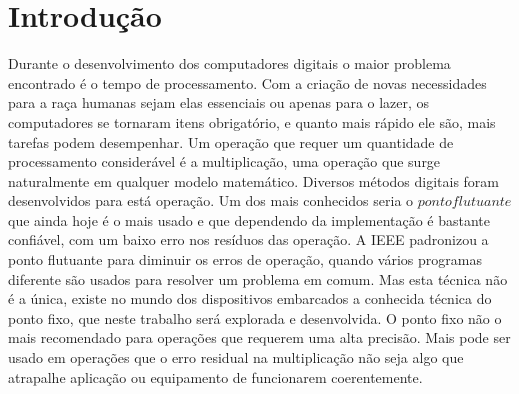 \section{Introdução}

Durante o desenvolvimento dos computadores digitais o maior problema encontrado
é o tempo de processamento. Com a criação de novas necessidades para a raça humanas
sejam elas essenciais ou apenas para o lazer, os computadores se tornaram 
itens obrigatório, e quanto mais rápido ele são, mais tarefas podem desempenhar.
Um operação que requer um quantidade de processamento considerável é a multiplicação,
uma operação que surge naturalmente em qualquer modelo matemático. Diversos
métodos digitais foram desenvolvidos para está operação. Um dos mais conhecidos 
seria o $ponto flutuante$ que ainda hoje é o mais usado e que dependendo da implementação
é bastante confiável, com um baixo erro nos resíduos das operação. A IEEE padronizou
a ponto flutuante para diminuir os erros de operação, quando vários programas 
diferente são usados para resolver um problema em comum. Mas esta técnica não
é a única, existe no mundo dos dispositivos embarcados a conhecida técnica do 
ponto fixo, que neste trabalho será explorada e desenvolvida. O ponto fixo 
não o mais recomendado para operações que requerem uma alta precisão. Mais 
pode ser usado em operações que o erro residual na multiplicação não seja
algo que atrapalhe aplicação ou equipamento de funcionarem coerentemente.

